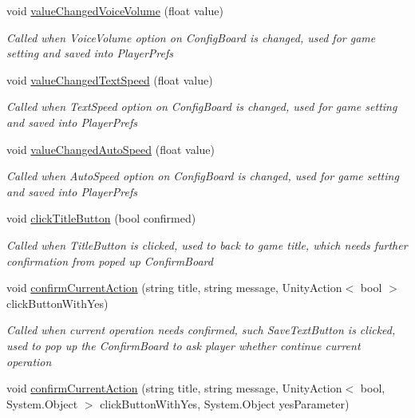 \begin{DoxyCompactItemize}
void \hyperlink{classdoki_unity_1_1_world_control_afe68f5556292c4534370c1fddf6cea85}{value\+Changed\+Voice\+Volume} (float value)
\begin{DoxyCompactList}\small\item\em Called when Voice\+Volume option on Config\+Board is changed, used for game setting and saved into Player\+Prefs \end{DoxyCompactList}\item 
void \hyperlink{classdoki_unity_1_1_world_control_a1e1996c4d563de0a87cd555bdd678cb6}{value\+Changed\+Text\+Speed} (float value)
\begin{DoxyCompactList}\small\item\em Called when Text\+Speed option on Config\+Board is changed, used for game setting and saved into Player\+Prefs \end{DoxyCompactList}\item 
void \hyperlink{classdoki_unity_1_1_world_control_a7a45fa13dfc12f20031a6a98d56f9da2}{value\+Changed\+Auto\+Speed} (float value)
\begin{DoxyCompactList}\small\item\em Called when Auto\+Speed option on Config\+Board is changed, used for game setting and saved into Player\+Prefs \end{DoxyCompactList}\item 
void \hyperlink{classdoki_unity_1_1_world_control_a7c23e87a393bd9ee80730ad28a5ecb5b}{click\+Title\+Button} (bool confirmed)
\begin{DoxyCompactList}\small\item\em Called when Title\+Button is clicked, used to back to game title, which needs further confirmation from poped up Confirm\+Board \end{DoxyCompactList}\item 
void \hyperlink{classdoki_unity_1_1_world_control_a58cb22ada26ebb40723b886e41ebf995}{confirm\+Current\+Action} (string title, string message, Unity\+Action$<$ bool $>$ click\+Button\+With\+Yes)
\begin{DoxyCompactList}\small\item\em Called when current operation needs confirmed, such Save\+Text\+Button is clicked, used to pop up the Confirm\+Board to ask player whether continue current operation \end{DoxyCompactList}\item 
void \hyperlink{classdoki_unity_1_1_world_control_aa59b432b818516551938ca516feeb746}{confirm\+Current\+Action} (string title, string message, Unity\+Action$<$ bool, System.\+Object $>$ click\+Button\+With\+Yes, System.\+Object yes\+Parameter)

\end{DoxyCompactItemize}
